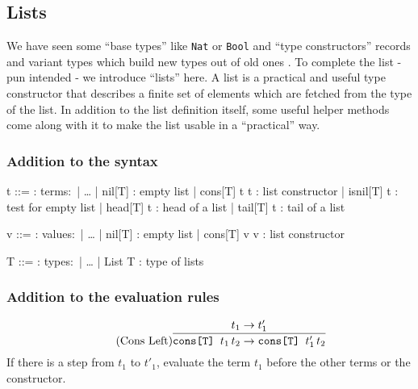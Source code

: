 \subsection{Lists}

We have seen some ``base types'' like \texttt{Nat} or \texttt{Bool}
and ``type constructors'' records and variant types which build
new types out of old ones \cite{pierce2002ProgLang}.
To complete the list - pun intended - we introduce
``lists'' here. A list is a practical and useful type constructor
that describes a finite set of elements which are fetched from the
type of the list.
In addition to the list definition itself, some useful helper
methods come along with it to make the list usable in a ``practical''
way.

\subsubsection{Addition to the syntax \cite{pierce2002ProgLang}}
\begin{bnfgrammar}
    t ::= : terms$\colon$
    | \dots
    | nil[T] : empty list
    | cons[T] t t : list constructor
    | isnil[T] t : test for empty list
    | head[T] t : head of a list
    | tail[T] t : tail of a list
\end{bnfgrammar}\leavevmode\newline

\begin{bnfgrammar}
    v ::= : values$\colon$
    | \dots
    | nil[T] : empty list
    | cons[T] v v : list constructor
\end{bnfgrammar}\leavevmode\newline

\begin{bnfgrammar}
    T ::= : types$\colon$
    | \dots
    | List T : type of lists
\end{bnfgrammar}\leavevmode\newline

\subsubsection{Addition to the evaluation rules \cite{pierce2002ProgLang}}
\begin{equation*}
    \tag{Cons Left}
    \infer{
        \texttt{cons[T] } t_1\,t_2 \rightarrow \texttt{cons[T] } t'_1\,t_2
    }{
        t_1 \rightarrow t'_1
    }
\end{equation*}
If there is a step from $t_1$ to $t'_1$, evaluate the term $t_1$
before the other terms or the constructor.

